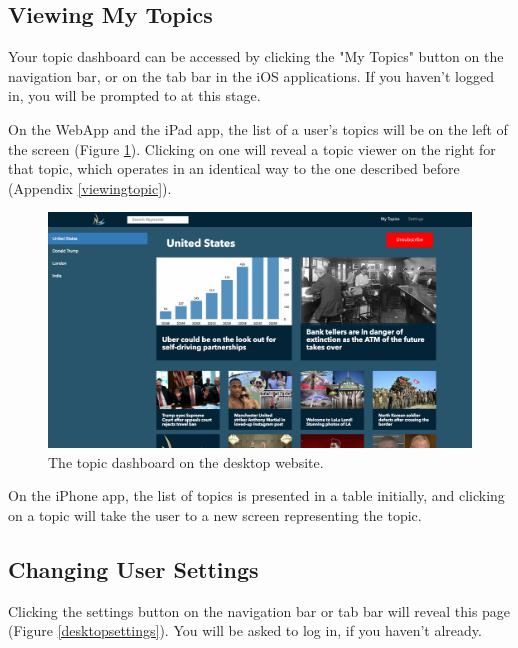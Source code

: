 \documentclass[12pt]{article}
\begin{document}
\begin{appendices}
\subsection{Viewing My Topics}

Your topic dashboard can be accessed by clicking the "My Topics" button on the navigation bar, or on the tab bar in the iOS applications. If you haven't logged in, you will be prompted to at this stage.

On the WebApp and the iPad app, the list of a user's topics will be on the left of the screen (Figure \ref{desktopdashboard}). Clicking on one will reveal a topic viewer on the right for that topic, which operates in an identical way to the one described before (Appendix \ref{viewingtopic}).

\begin{figure}[ht!]
  \centering
        \includegraphics[width=\textwidth]{desktopdashboard.PNG}
        \caption{The topic dashboard on the desktop website.}
   \label{desktopdashboard}
\end{figure}

On the iPhone app, the list of topics is presented in a table initially, and clicking on a topic will take the user to a new screen representing the topic.

\label{mytopics}

\subsection{Changing User Settings}

\label{settings}

Clicking the settings button on the navigation bar or tab bar will reveal this page (Figure \ref{desktopsettings}). You will be asked to log in, if you haven't already.


\end{appendices}
\end{document}
